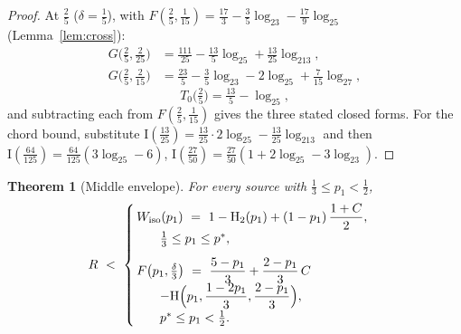 \documentclass[journal]{IEEEtran}
\newtheorem{theorem}{Theorem}
\theoremstyle{definition}
\newcommand{\Hh}{\mathrm H_2}
\newcommand{\lgg}{\log_2}
\newcommand{\CC}{C}
\begin{document}
\begin{proof}
At $\tfrac25$ ($\delta=\tfrac15$), with
$F(\tfrac25,\tfrac1{15})=\tfrac{17}3-\tfrac35\lgg3-\tfrac{17}9\lgg5$
(Lemma~\ref{lem:cross}):
\[
\begin{aligned}
  G\bigl(\tfrac25,\tfrac2{25}\bigr)
  &=\tfrac{111}{25}-\tfrac{13}5\lgg5+\tfrac{13}{25}\lgg13,\\
  G\bigl(\tfrac25,\tfrac2{15}\bigr)
  &=\tfrac{23}5-\tfrac35\lgg3-2\lgg5+\tfrac7{15}\lgg7,
\end{aligned}
\]
\[
  T_0\bigl(\tfrac25\bigr)=\tfrac{13}5-\lgg5,
\]
and subtracting each from $F(\tfrac25,\tfrac1{15})$ gives the three stated
closed forms. For the chord bound, substitute
$\mathrm I(\tfrac{13}{25})=\tfrac{13}{25}\cdot2\lgg5-\tfrac{13}{25}\lgg13$ and
then $\mathrm I(\tfrac{64}{125})=\tfrac{64}{125}(3\lgg5-6)$,
$\mathrm I(\tfrac{27}{50})=\tfrac{27}{50}(1+2\lgg5-3\lgg3)$.
\end{proof}

\begin{theorem}[Middle envelope]\label{thm:mid}
For every source with $\tfrac13\le p_1<\tfrac12$,
\[
  R\ <\ \begin{cases}
  \,W_{\mathrm{iso}}(p_1)\ =\ 1-\Hh(p_1)+(1-p_1)\,\dfrac{1+\CC}2,\\
  \qquad \tfrac13\le p_1\le p^*,\\[8pt]
  \,F\bigl(p_1,\tfrac\delta3\bigr)\ =\ \dfrac{5-p_1}{3}
    +\dfrac{2-p_1}{3}\,\CC\\
  \qquad -\mathrm H\Bigl(p_1,\dfrac{1-2p_1}{3},\dfrac{2-p_1}{3}\Bigr),\\
  \qquad p^*\le p_1<\tfrac12.
  \end{cases}
\]
\end{theorem}
\end{document}
